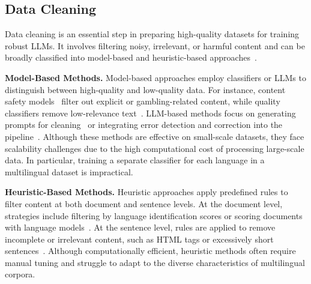 \subsection{Data Cleaning}
\label{sec:related_data_clean}
Data cleaning is an essential step in preparing high-quality datasets for training robust LLMs.
It involves filtering noisy, irrelevant, or harmful content and can be broadly classified into model-based and heuristic-based approaches~\cite{liu2024datasets}.

\noindent\textbf{Model-Based Methods.}
Model-based approaches employ classifiers or LLMs to distinguish between high-quality and low-quality data.
For instance, content safety models~\cite{li-etal-2024-salad} filter out explicit or gambling-related content, while quality classifiers remove low-relevance text~\cite{jiang2024more}.
LLM-based methods focus on generating prompts for cleaning~\cite{narayan2022can} or integrating error detection and correction into the pipeline~\cite{chen2023seed,ni2024iterclean}.
Although these methods are effective on small-scale datasets, they face scalability challenges due to the high computational cost of processing large-scale data.
In particular, training a separate classifier for each language in a multilingual dataset is impractical.

\noindent\textbf{Heuristic-Based Methods.}
Heuristic approaches apply predefined rules to filter content at both document and sentence levels.
At the document level, strategies include filtering by language identification scores or scoring documents with language models~\cite{laurenccon2022bigscience,nguyen-etal-2024-culturax}.
At the sentence level, rules are applied to remove incomplete or irrelevant content, such as HTML tags or excessively short sentences~\cite{raffel2020exploring,abadji2022towards}.
Although computationally efficient, heuristic methods often require manual tuning and struggle to adapt to the diverse characteristics of multilingual corpora.